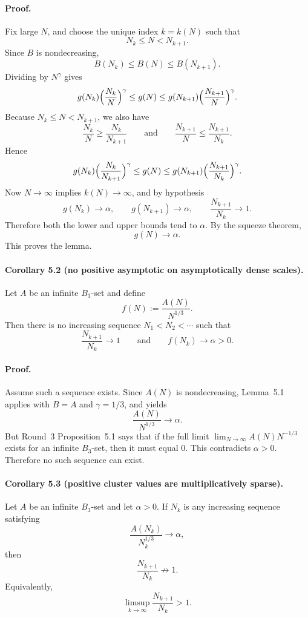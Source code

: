 \paragraph{Proof.}
Fix large $N$, and choose the unique index $k=k(N)$ such that
\[
N_k\le N < N_{k+1}.
\]
Since $B$ is nondecreasing,
\[
B(N_k)\le B(N)\le B(N_{k+1}).
\]
Dividing by $N^{\gamma}$ gives
\[
g(N_k)\Bigl(\frac{N_k}{N}\Bigr)^{\gamma}
\le g(N)
\le g(N_{k+1})\Bigl(\frac{N_{k+1}}{N}\Bigr)^{\gamma}.
\]
Because $N_k\le N < N_{k+1}$, we also have
\[
\frac{N_k}{N}\ge \frac{N_k}{N_{k+1}}
\qquad\text{and}\qquad
\frac{N_{k+1}}{N}\le \frac{N_{k+1}}{N_k}.
\]
Hence
\[
g(N_k)\Bigl(\frac{N_k}{N_{k+1}}\Bigr)^{\gamma}
\le g(N)
\le g(N_{k+1})\Bigl(\frac{N_{k+1}}{N_k}\Bigr)^{\gamma}.
\]
Now $N\to\infty$ implies $k(N)\to\infty$, and by hypothesis
\[
g(N_k)\to \alpha,
\qquad
g(N_{k+1})\to \alpha,
\qquad
\frac{N_{k+1}}{N_k}\to 1.
\]
Therefore both the lower and upper bounds tend to $\alpha$. By the squeeze theorem,
\[
g(N)\to \alpha.
\]
This proves the lemma.

\paragraph{Corollary 5.2 (no positive asymptotic on asymptotically dense scales).}
Let $A$ be an infinite $B_3$-set and define
\[
f(N):=\frac{A(N)}{N^{1/3}}.
\]
Then there is no increasing sequence $N_1<N_2<\cdots$ such that
\[
\frac{N_{k+1}}{N_k}\to 1
\qquad\text{and}\qquad
f(N_k)\to \alpha>0.
\]

\paragraph{Proof.}
Assume such a sequence exists. Since $A(N)$ is nondecreasing, Lemma~5.1 applies with $B=A$ and $\gamma=1/3$, and yields
\[
\frac{A(N)}{N^{1/3}}\to \alpha.
\]
But Round~3 Proposition~5.1 says that if the full limit $\lim_{N\to\infty}A(N)N^{-1/3}$ exists for an infinite $B_3$-set, then it must equal $0$. This contradicts $\alpha>0$. Therefore no such sequence can exist.

\paragraph{Corollary 5.3 (positive cluster values are multiplicatively sparse).}
Let $A$ be an infinite $B_3$-set and let $\alpha>0$. If $N_k$ is any increasing sequence satisfying
\[
\frac{A(N_k)}{N_k^{1/3}}\to \alpha,
\]
then
\[
\frac{N_{k+1}}{N_k}\not\to 1.
\]
Equivalently,
\[
\limsup_{k\to\infty}\frac{N_{k+1}}{N_k}>1.
\]

